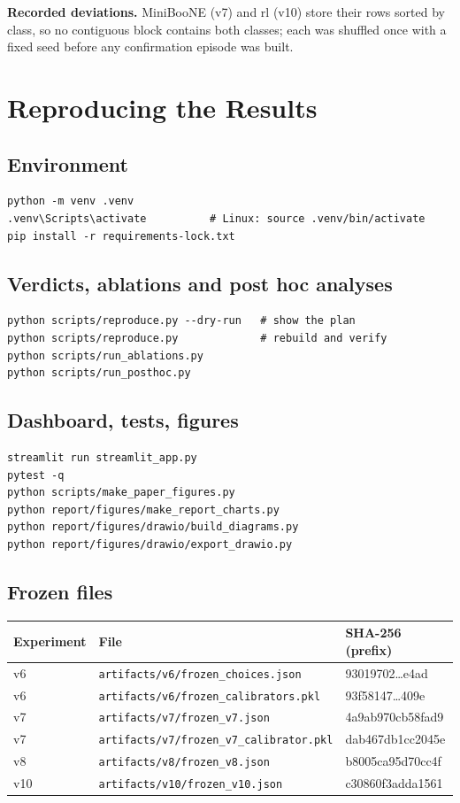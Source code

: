 \noindent\textbf{Recorded deviations.} MiniBooNE (v7) and rl (v10) store their rows sorted by class, so no contiguous block contains both classes; each was shuffled once with a fixed seed before any confirmation episode was built.

\chapter{Reproducing the Results}
\label{app:repro}
\section{Environment}
{\small
\begin{verbatim}
python -m venv .venv
.venv\Scripts\activate          # Linux: source .venv/bin/activate
pip install -r requirements-lock.txt
\end{verbatim}
}

\section{Verdicts, ablations and post hoc analyses}
{\small
\begin{verbatim}
python scripts/reproduce.py --dry-run   # show the plan
python scripts/reproduce.py             # rebuild and verify
python scripts/run_ablations.py
python scripts/run_posthoc.py
\end{verbatim}
}

\section{Dashboard, tests, figures}
{\small
\begin{verbatim}
streamlit run streamlit_app.py
pytest -q
python scripts/make_paper_figures.py
python report/figures/make_report_charts.py
python report/figures/drawio/build_diagrams.py
python report/figures/drawio/export_drawio.py
\end{verbatim}
}

\section{Frozen files}
\begin{table}[H]
\centering
\small
\begin{tabular}{@{}lll@{}}
\toprule
Experiment & File & SHA-256 (prefix) \\
\midrule
v6 & \texttt{artifacts/v6/frozen\_choices.json} & 93019702\ldots e4ad \\
v6 & \texttt{artifacts/v6/frozen\_calibrators.pkl} & 93f58147\ldots 409e \\
v7 & \texttt{artifacts/v7/frozen\_v7.json} & 4a9ab970cb58fad9 \\
v7 & \texttt{artifacts/v7/frozen\_v7\_calibrator.pkl} & dab467db1cc2045e \\
v8 & \texttt{artifacts/v8/frozen\_v8.json} & b8005ca95d70cc4f \\
v10 & \texttt{artifacts/v10/frozen\_v10.json} & c30860f3adda1561 \\
\bottomrule
\end{tabular}
\end{table}
